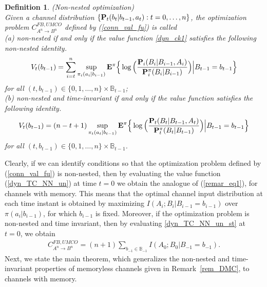 \documentclass[11pt, a4paper, journal,onecolumn]{IEEEtran}
\newcommand{\mb}{\mathbb}
\newcommand{\rar}{\rightarrow}
\newtheorem{definition}{Definition}[section]
\begin{document}
\begin{definition}(Non-nested optimization)\\
Given a channel distribution $\{{\bf P}_t(b_t|b_{t-1},a_t): t =0, \ldots, n\}$, the optimization problem  $C_{A^n \rar B^n}^{FB,UMCO}$ defined by  (\ref{conn_val_fu}) is called \\
(a) non-nested if and only if the value function \eqref{dyn_ck1} satisfies the  following non-nested identity.
\begin{align}
V_t(b_{t-1})=\sum_{i=t}^n \sup_{\pi_i(a_i|b_{i-1})}{\bf E}^\pi\Big\{\log\Big(\frac{{\bf P}_i(B_i|B_{i-1},A_i)}{{\bf P}_i^\pi(B_i|B_{i-1})}\Big)\Big|B_{t-1}=b_{t-1}\Big\} \label{dyn_TC_NN_un}
\end{align}
for all $(t, b_{t-1})\in \{0, 1, \ldots, n\} \times {\mb B}_{t-1}$; \\
(b) non-nested and time-invariant if and only if the value function satisfies the following identity.
\begin{align}
V_t(b_{t-1})=(n-t+1) \sup_{\pi_t(a_t|b_{t-1})}{\bf E}^\pi\Big\{\log\Big(\frac{{\bf P}_t(B_t|B_{t-1},A_t)}{{\bf P}_t^\pi(B_t|B_{t-1})}\Big)\Big|B_{t-1}=b_{t-1}\Big\} \label{dyn_TC_NN_un_st}
\end{align}
for all $(t, b_{t-1})\in \{0, 1, \ldots, n\} \times {\mb B}_{t-1}$.\\
\end{definition}

Clearly, if we can identify conditions so that the optimization problem defined by (\ref{conn_val_fu}) is non-nested, then by evaluating the value function (\ref{dyn_TC_NN_un}) at time $t=0$ we obtain the analogue of (\ref{remar_eq1}), for channels with memory. This means that the optimal channel input distribution at each time instant is obtained by maximizing $I(A_i;B_i|B_{i-1}=b_{i-1})$ over $\pi(a_i|b_{i-1})$, for which $b_{i-1}$ is fixed. Moreover, if the optimization problem is non-nested and time invariant, then by evaluating \eqref{dyn_TC_NN_un_st} at $t=0$, we obtain
\begin{align}
C_{A^n \rar B^n}^{FB,UMCO}=(n+1)\sum_{b_{-1}\in {\mb B}_{-1}}I(A_0;B_0|B_{-1}=b_{-1}).  \label{dyn_TC_NN_un_st21}
\end{align}
Next, we state the main theorem, which generalizes the non-nested and time-invariant properties of memoryless channels given in Remark~\ref{rem_DMC}, to channels with memory. \\
\end{document}
